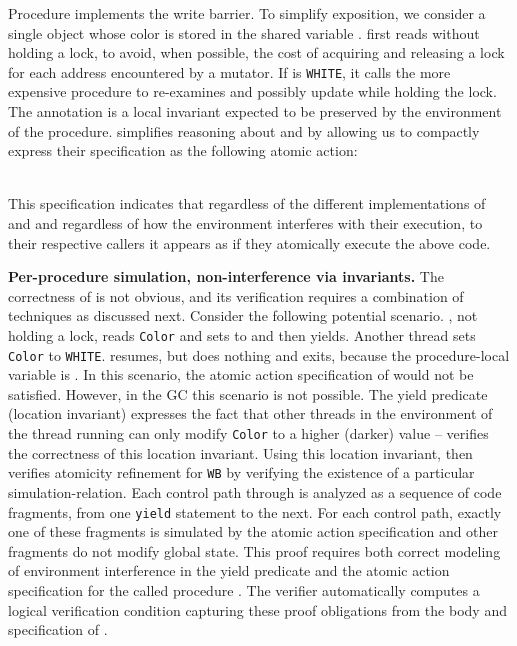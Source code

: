 Procedure  implements the write barrier.
To simplify exposition, 
we consider a single object whose color is stored in the shared variable .
 first reads  without holding a lock, to avoid,
when possible, the
cost of acquiring and releasing a lock for each address encountered by
a mutator. 
If  is {\tt WHITE}, it calls the more expensive procedure  
to re-examines and possibly update  while holding the
lock. The annotation   is a local invariant
expected to be preserved by the environment of the  procedure. 
\civl simplifies reasoning about  and  by allowing us to 
compactly express their specification as the following atomic action:\\
\begin{small}
\begin{tt}
[if (Color == WHITE)  Color := GRAY]
\end{tt}
\end{small}\\
This specification indicates that regardless of the different implementations of 
 and  and regardless of how the environment interferes
with their execution, to their respective callers it appears as if they atomically execute the above code.

{\bf Per-procedure simulation, non-interference via invariants.}
The correctness of  is not obvious, and its verification
requires a combination of techniques as discussed next. 
Consider the following potential scenario. 
, not holding a lock, reads {\tt Color} and
sets  to  and then yields. Another thread sets {\tt Color} to
{\tt WHITE}.  resumes, but does nothing and exits,
because the procedure-local variable  is . In this scenario, the atomic action
specification of  would not be satisfied. However, in the GC this
scenario is not possible. 
The yield predicate (location invariant) expresses the fact that
other threads in the environment of the thread running  can
only modify {\tt Color} to a higher (darker) value -- \civl verifies the correctness
of this location invariant.
Using this location invariant, \civl then verifies atomicity
refinement for {\tt WB} by verifying the existence of a particular
simulation-relation. Each control path through  is analyzed as
a sequence of code fragments, from one {\tt yield} statement to the
next. For each control path, exactly one of these fragments is simulated by the atomic action specification and other fragments do not modify
global state. 
This proof requires both correct modeling of environment interference in the yield predicate
and the atomic action specification for the called procedure .
The \civl verifier automatically computes a logical verification condition capturing
these proof obligations from the body and specification of .

